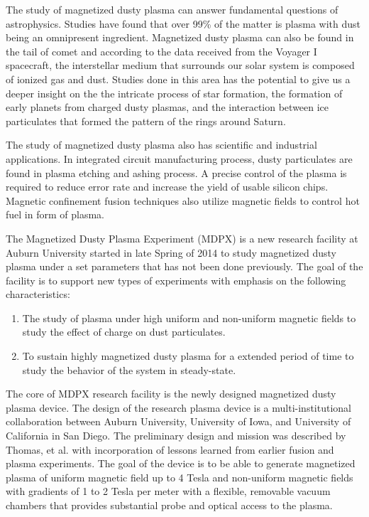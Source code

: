 The study of magnetized dusty plasma can answer fundamental questions of astrophysics. Studies have found that over 99\% of the matter is plasma with dust being an omnipresent ingredient\cite{shukla2010introduction}. Magnetized dusty plasma can also be found in the tail of comet\cite{niedner1978interplanetary} and according to the data received from the Voyager I spacecraft, the interstellar medium that surrounds our solar system is composed of ionized gas and dust\cite{website:Weiss2013voyager, website:Cook2013voyager, burke1983gas}. Studies done in this area has the potential to give us a deeper insight on the the intricate process of star formation\cite{mestel1956star}, the formation of early planets from charged dusty plasmas, and the interaction between ice particulates that formed the pattern of the rings around Saturn\cite{gurnett1983micron, goertz1983model}.

The study of magnetized dusty plasma also has scientific and industrial applications. In integrated circuit manufacturing process, dusty particulates are found in plasma etching and ashing process. A precise control of the plasma is required to reduce error rate and increase the yield of usable silicon chips. Magnetic confinement fusion techniques also utilize magnetic fields to control hot fuel in form of plasma.

The Magnetized Dusty Plasma Experiment (MDPX) is a new research facility at Auburn University started in late Spring of 2014 to study magnetized dusty plasma under a set parameters that has not been done previously. The goal of the facility is to support new types of experiments with emphasis on the following characteristics:

\begin{enumerate}
\item The study of plasma under high uniform and non-uniform magnetic fields to study the effect of charge on dust particulates.
\item To sustain highly magnetized dusty plasma for a extended period of time to study the behavior of the system in steady-state.
\end{enumerate}

The core of MDPX research facility is the newly designed magnetized dusty plasma device. The design of the research plasma device is a multi-institutional collaboration between Auburn University, University of Iowa, and University of California in San Diego. The preliminary design and mission was described by Thomas, et al. with incorporation of lessons learned from earlier fusion and plasma experiments. The goal of the device is to be able to generate magnetized plasma of uniform magnetic field up to 4 Tesla and non-uniform magnetic fields with gradients of 1 to 2 Tesla per meter with a flexible, removable vacuum chambers that provides substantial probe and optical access to the plasma\cite{PLA:9579370}.

